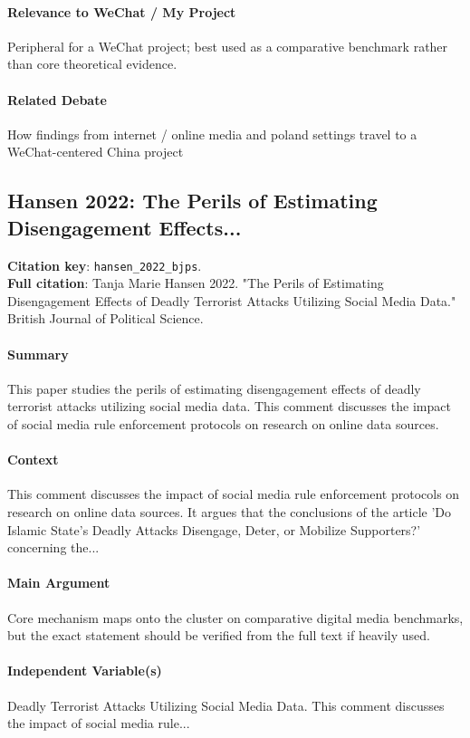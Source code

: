 \documentclass[12pt]{article}
\begin{document}
\paragraph{Relevance to WeChat / My Project} Peripheral for a WeChat project; best used as a comparative benchmark rather than core theoretical evidence.

\paragraph{Related Debate} How findings from internet / online media and poland settings travel to a WeChat-centered China project


\subsection{Hansen 2022: The Perils of Estimating Disengagement Effects...}
\textbf{Citation key}: \texttt{hansen\_2022\_bjps}.\\
\textbf{Full citation}: Tanja Marie Hansen 2022. "The Perils of Estimating Disengagement Effects of Deadly Terrorist Attacks Utilizing Social Media Data." British Journal of Political Science.

\paragraph{Summary} This paper studies the perils of estimating disengagement effects of deadly terrorist attacks utilizing social media data. This comment discusses the impact of social media rule enforcement protocols on research on online data sources.

\paragraph{Context} This comment discusses the impact of social media rule enforcement protocols on research on online data sources. It argues that the conclusions of the article 'Do Islamic State's Deadly Attacks Disengage, Deter, or Mobilize Supporters?' concerning the...

\paragraph{Main Argument} Core mechanism maps onto the cluster on comparative digital media benchmarks, but the exact statement should be verified from the full text if heavily used.

\paragraph{Independent Variable(s)} Deadly Terrorist Attacks Utilizing Social Media Data. This comment discusses the impact of social media rule...
\end{document}
